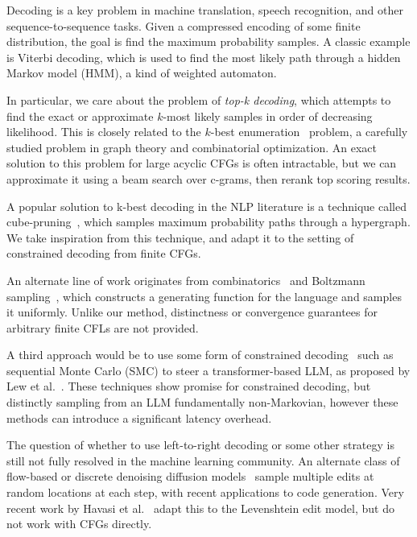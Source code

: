 \documentclass[sigplan,review,acmsmall,nonacm,screen,anonymous]{acmart}\settopmatter{printfolios=false,printccs=false,printacmref=false}
\begin{document}
Decoding is a key problem in machine translation, speech recognition, and other sequence-to-sequence tasks. Given a compressed encoding of some finite distribution, the goal is find the maximum probability samples. A classic example is Viterbi decoding, which is used to find the most likely path through a hidden Markov model (HMM), a kind of weighted automaton.

In particular, we care about the problem of \textit{top-k decoding}, which attempts to find the exact or approximate $k$-most likely samples in order of decreasing likelihood. This is closely related to the $k$-best enumeration~\cite{eppstein2014k} problem, a carefully studied problem in graph theory and combinatorial optimization. An exact solution to this problem for large acyclic CFGs is often intractable, but we can approximate it using a beam search over c-grams, then rerank top scoring results.

A popular solution to k-best decoding in the NLP literature is a technique called cube-pruning~\cite{huang2005better, chiang2007hierarchical}, which samples maximum probability paths through a hypergraph. We take inspiration from this technique, and adapt it to the setting of constrained decoding from finite CFGs.

An alternate line of work originates from combinatorics~\cite{hickey1983uniform, gore1997quasi} and Boltzmann sampling~\cite{duchon2004boltzmann}, which constructs a generating function for the language and samples it uniformly. Unlike our method, distinctness or convergence guarantees for arbitrary finite CFLs are not provided.

A third approach would be to use some form of constrained decoding~\cite{loula2025syntactic} such as sequential Monte Carlo (SMC) to steer a transformer-based LLM, as proposed by Lew et al.~\cite{lew2023sequential}. These techniques show promise for constrained decoding, but distinctly sampling from an LLM fundamentally non-Markovian, however these methods can introduce a significant latency overhead.

The question of whether to use left-to-right decoding or some other strategy is still not fully resolved in the machine learning community. An alternate class of flow-based or discrete denoising diffusion models~\cite{austin2021structured} sample multiple edits at random locations at each step, with recent applications to code generation. Very recent work by Havasi et al.~\cite{havasi2025edit} adapt this to the Levenshtein edit model, but do not work with CFGs directly.
\end{document}
